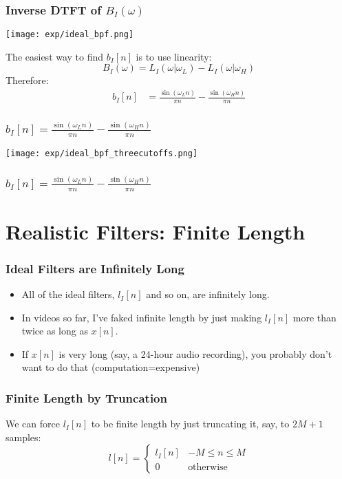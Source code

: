 \documentclass{beamer}
\begin{document}
\begin{frame}
  \frametitle{Inverse DTFT of $B_I(\omega)$}

  \centerline{\texttt{[image: exp/ideal\_bpf.png]}}
  
  The easiest way to find $b_I[n]$ is to use linearity:
  \[
  B_I(\omega) = L_I(\omega|\omega_L) - L_I(\omega|\omega_H)
  \]
  Therefore:
  \begin{align*}
    b_I[n] &= \frac{\sin(\omega_L n)}{\pi n}-\frac{\sin(\omega_H n)}{\pi n}
  \end{align*}
\end{frame}

\begin{frame}
  \frametitle{$b_I[n] = \frac{\sin(\omega_L n)}{\pi n}-\frac{\sin(\omega_H n)}{\pi n}$}

  \centerline{\texttt{[image: exp/ideal\_bpf\_threecutoffs.png]}}

\end{frame}


\begin{frame}
  \frametitle{$b_I[n] = \frac{\sin(\omega_L n)}{\pi n}-\frac{\sin(\omega_H n)}{\pi n}$}

  \centerline{}  
\end{frame}

\section[Finite-Length]{Realistic Filters: Finite Length}
\setcounter{subsection}{1}

\begin{frame}
  \frametitle{Ideal Filters are Infinitely Long}
  
  \begin{itemize}
  \item All of the ideal filters, $l_I[n]$ and so on, are infinitely
    long.
  \item In videos so far, I've faked infinite length by just making
    $l_I[n]$ more than twice as long as $x[n]$.
  \item If $x[n]$ is very long (say, a 24-hour audio recording), you
    probably don't want to do that (computation=expensive)
  \end{itemize}
\end{frame}


\begin{frame}
  \frametitle{Finite Length by Truncation}

  We can force $l_I[n]$ to be finite length by just truncating it,
  say, to $2M+1$ samples:
  \[
  l[n] = \begin{cases}
    l_I[n] & -M\le n\le M\\
    0 &\mbox{otherwise}
  \end{cases}
  \]
\end{frame}
\end{document}
